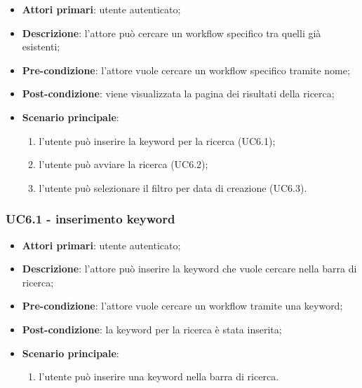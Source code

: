 \begin{itemize}
\item \textbf{Attori primari}: utente autenticato;

\item \textbf{Descrizione}: l'attore può cercare un workflow specifico tra quelli già esistenti;

\item \textbf{Pre-condizione}: l'attore vuole cercare un workflow specifico tramite nome;

\item \textbf{Post-condizione}: viene visualizzata la pagina dei risultati della ricerca;

\item \textbf{Scenario principale}:
\begin{enumerate}
\item l'utente può inserire la keyword per la ricerca (UC6.1);
\item l'utente può avviare la ricerca (UC6.2);
\item l'utente può selezionare il filtro per data di creazione (UC6.3).
\end{enumerate}
\end{itemize}

\subsubsection{UC6.1 - inserimento keyword}

\begin{itemize}
\item \textbf{Attori primari}: utente autenticato;

\item \textbf{Descrizione}:  l'attore può inserire la keyword che vuole cercare nella barra di ricerca;

\item \textbf{Pre-condizione}: l'attore vuole cercare un workflow tramite una keyword;

\item \textbf{Post-condizione}: la keyword per la ricerca è stata inserita;

\item \textbf{Scenario principale}:
\begin{enumerate}
\item l'utente può inserire una keyword nella barra di ricerca.
\end{enumerate}
\end{itemize}

